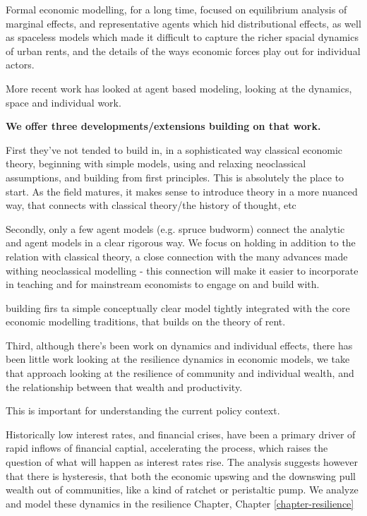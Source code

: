 Formal economic modelling, for a long time, focused on equilibrium analysis of marginal effects, and representative agents which hid distributional effects, as well as spaceless models which made it difficult to capture the richer spacial dynamics of urban rents, and the details of the ways economic forces play out for individual actors.

More recent work has looked at agent based modeling, looking at the dynamics, space and individual work. 

\textbf{We offer three developments/extensions building on that work.}

First they've not tended to build in, in a sophisticated way classical economic theory, beginning with simple models, using and relaxing neoclassical assumptions, and building from first principles. This is absolutely the place to start. As the field matures, it makes sense to introduce theory in a more nuanced way, that connects with classical theory/the history of thought, etc

Secondly, only a few agent models (e.g. spruce budworm) connect the analytic and agent models in a clear rigorous way. We focus on holding in addition to the relation with classical theory, a close connection with the many advances made withing neoclassical modelling - this connection will make it easier to incorporate in teaching and for mainstream economists to engage on and build with.


building firs ta simple conceptually clear model tightly integrated with the core economic modelling traditions, that builds on the theory of rent.


Third, although there's been work on dynamics and individual effects, there has been little work looking at the resilience dynamics in economic models, we take that approach looking at the resilience of community and individual wealth, and the relationship between that wealth and productivity. 

This is important for understanding the current policy context. 

Historically low interest rates, and financial crises, have been a primary driver of rapid inflows of financial captial, accelerating the process, which raises the question of what will happen as interest rates rise. The analysis suggests however that there is hysteresis, that both the economic upswing and the downswing pull wealth out of communities, like a kind of ratchet or peristaltic pump. We analyze and model these dynamics in the resilience Chapter, Chapter \ref{chapter-resilience}







